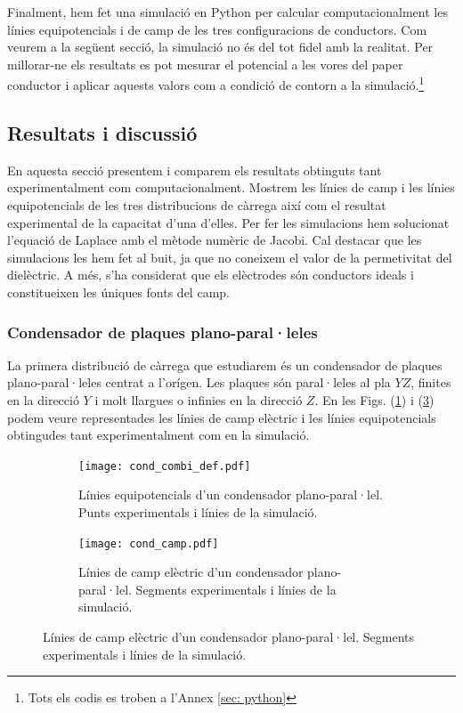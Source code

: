 \documentclass[11pt]{article}
\numberwithin{equation}{section}
\numberwithin{figure}{section}
\numberwithin{table}{section}
\begin{document}
Finalment, hem fet una simulació en Python per calcular computacionalment les línies equipotencials i de camp de les tres configuracions de conductors. Com veurem a la següent secció, la simulació no és del tot fidel amb la realitat. Per millorar-ne els resultats es pot mesurar el potencial a les vores del paper conductor i aplicar aquests valors com a condició de contorn a la simulació.\footnote{\label{nota: codis}Tots els codis es troben a l'Annex \ref{sec: python}}

\subsection{Resultats i discussió}\label{sec: resultats}
En aquesta secció presentem i comparem els resultats obtinguts tant experimentalment com computacionalment. Mostrem les línies de camp i les línies equipotencials de les tres distribucions de càrrega així com el resultat experimental de la capacitat d'una d'elles. Per fer les simulacions hem solucionat l'equació de Laplace amb el mètode numèric de Jacobi\footnotemark[3]. Cal destacar que les simulacions les hem fet al buit, ja que no coneixem el valor de la permetivitat del dielèctric. A més, s'ha considerat que els elèctrodes són conductors ideals i constitueixen les úniques fonts del camp.

\subsubsection{Condensador de plaques plano-paral·leles}\label{sec: cond}
La primera distribució de càrrega que estudiarem és un condensador de plaques plano-paral·leles centrat a l'orígen. Les plaques són paral·leles al pla $YZ$, finites en la direcció $Y$ i molt llargues o infinies en la direcció $Z$.
En les Figs. (\ref{fig: cond_pot}) i (\ref{fig: cond_e}) podem veure representades les línies de camp elèctric i les línies equipotencials obtingudes tant experimentalment com en la simulació.   
\begin{figure}[h]
    \centering
    \begin{subfigure}{0.495\textwidth}
        \centering
        \texttt{[image: cond\_combi\_def.pdf]}
        \caption{Línies equipotencials d'un condensador plano-paral·lel. Punts experimentals i línies de la simulació.}
        \label{fig: cond_pot}
    \end{subfigure}
    \begin{subfigure}{0.495\textwidth} 
        \centering
        \texttt{[image: cond\_camp.pdf]}
        \caption{Línies de camp elèctric d'un condensador plano-paral·lel. Segments experimentals i línies de la simulació.}
        \label{fig: cond_e}
    \end{subfigure}
\end{figure}
\end{document}
